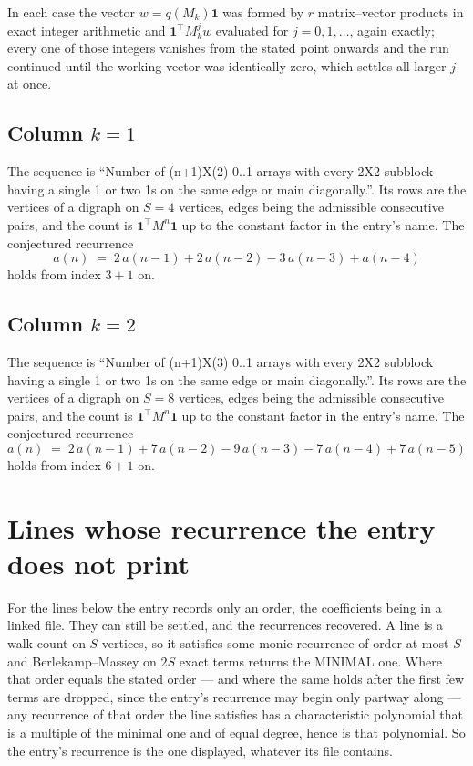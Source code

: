 \documentclass[11pt,a4paper]{article}
\theoremstyle{plain}
\theoremstyle{definition}
\begin{document}
In each case the vector $w=q(M_k)\mathbf{1}$ was formed by $r$ matrix--vector products in
exact integer arithmetic and $\mathbf{1}^{\!\top}M_k^{j}w$ evaluated for $j=0,1,\dots$,
again exactly; every one of those integers vanishes from the stated point onwards and the run
continued until the working vector was identically zero, which settles all larger $j$ at once.

\subsection*{Column $k$$=1$}
The sequence is ``Number of (n+1)X(2) 0..1 arrays with every 2X2 subblock having a single 1 or two 1s on the same edge or main diagonally.''. Its rows are the vertices of a digraph on
$S=4$ vertices, edges being the admissible consecutive pairs, and the count is
$\mathbf{1}^{\!\top}M^{n}\mathbf{1}$ up to the constant factor in the entry's name.
The conjectured recurrence
\[
a(n)\;=\;2\,a(n-1) + 2\,a(n-2) - 3\,a(n-3) + a(n-4)
\]
holds from index $3+1$ on.

\subsection*{Column $k$$=2$}
The sequence is ``Number of (n+1)X(3) 0..1 arrays with every 2X2 subblock having a single 1 or two 1s on the same edge or main diagonally.''. Its rows are the vertices of a digraph on
$S=8$ vertices, edges being the admissible consecutive pairs, and the count is
$\mathbf{1}^{\!\top}M^{n}\mathbf{1}$ up to the constant factor in the entry's name.
The conjectured recurrence
\[
a(n)\;=\;2\,a(n-1) + 7\,a(n-2) - 9\,a(n-3) - 7\,a(n-4) + 7\,a(n-5)
\]
holds from index $6+1$ on.


\section{Lines whose recurrence the entry does not print}

For the lines below the entry records only an order, the coefficients being in a linked file.
They can still be settled, and the recurrences recovered. A line is a walk count on $S$
vertices, so it satisfies some monic recurrence of order at most $S$ and Berlekamp--Massey on
$2S$ exact terms returns the MINIMAL one. Where that order equals the stated order --- and
where the same holds after the first few terms are dropped, since the entry's recurrence may
begin only partway along --- any recurrence of that order the line satisfies has a
characteristic polynomial that is a multiple of the minimal one and of equal degree, hence is
that polynomial. So the entry's recurrence is the one displayed, whatever its file contains.
\end{document}
